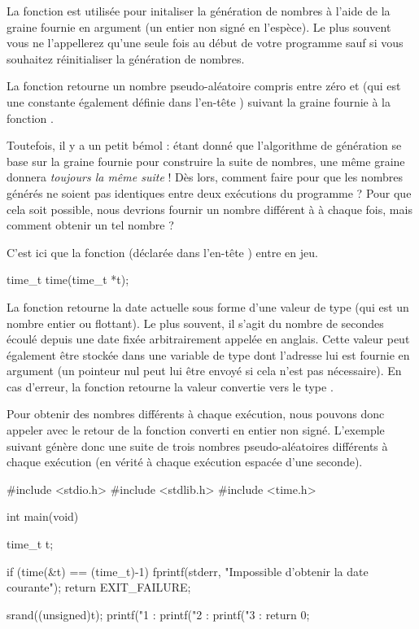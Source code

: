 La fonction  est utilisée pour initaliser la génération
de nombres à l'aide de la graine fournie en argument (un entier non
signé en l'espèce). Le plus souvent vous ne l'appellerez qu'une seule
fois au début de votre programme sauf si vous souhaitez réinitialiser la
génération de nombres.

La fonction  retourne un nombre pseudo-aléatoire compris
entre zéro et  (qui est une constante également
définie dans l'en-tête )
suivant la graine fournie à la fonction .

Toutefois, il y a un petit bémol : étant donné que l'algorithme de
génération se base sur la graine fournie pour construire la suite de
nombres, une même graine donnera \emph{toujours la même suite} ! Dès
lors, comment faire pour que les nombres générés ne soient pas
identiques entre deux exécutions du programme ? Pour que cela soit
possible, nous devrions fournir un nombre différent à  à
chaque fois, mais comment obtenir un tel nombre ?

C'est ici que la fonction  (déclarée dans l'en-tête
) entre en jeu.

\begin{C}
time_t time(time_t *t);
\end{C}

La fonction  retourne la date actuelle sous forme d'une
valeur de type  (qui est un nombre entier ou flottant).
Le plus souvent, il s'agit du nombre de secondes écoulé depuis une date
fixée arbitrairement appelée
 en anglais. Cette
valeur peut également être stockée dans une variable de type
 dont l'adresse lui est fournie en argument (un pointeur
nul peut lui être envoyé si cela n'est pas nécessaire). En cas d'erreur,
la fonction retourne la valeur  convertie vers le type
.

Pour obtenir des nombres différents à chaque exécution, nous pouvons
donc appeler  avec le retour de la fonction
 converti en entier non signé. L'exemple suivant génère
donc une suite de trois nombres pseudo-aléatoires différents à chaque
exécution (en vérité à chaque exécution espacée d'une seconde).

\begin{C}
#include <stdio.h>
#include <stdlib.h>
#include <time.h>


int main(void)
{
    time_t t;

    if (time(&t) == (time_t)-1)
    {
        fprintf(stderr, "Impossible d'obtenir la date courante\n");
        return EXIT_FAILURE;
    }

    srand((unsigned)t);
    printf("1 : %
    printf("2 : %
    printf("3 : %
    return 0;
}
\end{C}

